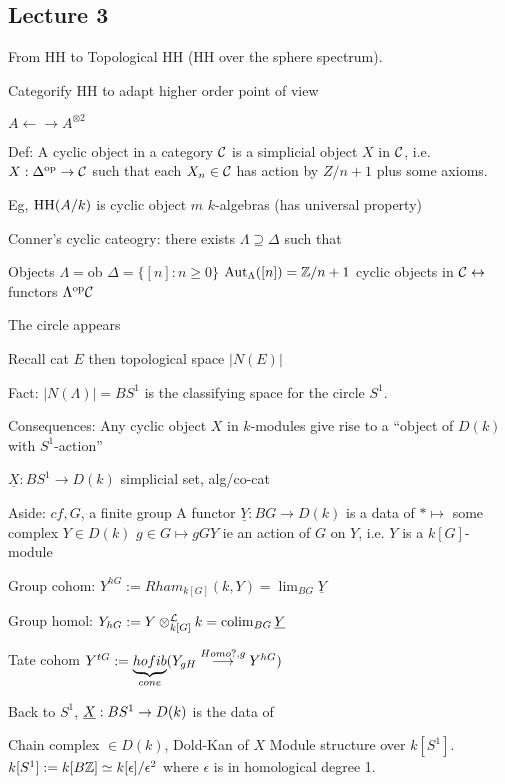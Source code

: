 \newpage
\subsection{Lecture 3}

From HH to Topological HH (HH over the sphere spectrum).

Categorify HH to adapt higher order point of view

$A \leftarrow \rightarrow A^{\otimes 2}$ %


Def: A cyclic object in a category $\mathcal{C}$ is a simplicial object $X$ in $\mathcal{C}$, i.e. $X: \Delta^\text{op} \to \mathcal{C}$ such that each $X_n \in \mathcal{C}$ has action by $Z/n+1$ plus some axioms. 




Eg, $\operatorname{HH}(A/k)$ is cyclic object $m$ $k$-algebras (has universal property)

Conner's cyclic cateogry: there exists $\Lambda \supseteq \Delta$ such that 

Objects $\Lambda= $ob $\Delta=\{[n] \colon n \geq 0\}$
$\operatorname{Aut}_\Lambda([n])= \mathbb{Z}/n+1$
cyclic objects in $\mathcal{C} \leftrightarrow$ functors $\Lambda^{\text{op}} \mathcal{C}$

The circle appears

Recall cat $E$ then topological space $|N(E)|$

Fact: $|N(\Lambda)|= BS^1$ is the classifying space for the circle $S^1$. 

Consequences: Any cyclic object $X$ in $k$-modules give rise to a ``object of $D(k)$ with $S^1$-action''

$\underline{X}: BS^1 \to D(k)$
simplicial set, alg/co-cat

Aside: $cf, G$, a finite group
A functor $\underline{Y}: BG \to D(k)$ is a data of 
$* \mapsto$ some complex $Y \in D(k)$
$g \in G \mapsto gGY$ ie an action of $G$ on $Y$, i.e. $Y$ is a $k[G]$-module

Group cohom: 
$Y^{hG}:= Rham_{k[G]}(k,Y)= \lim_{BG} \underline{Y}$

Group homol:
$Y_{hG}:= Y \otimes_{k[G]}^\mathcal{L} k = \operatorname{colim}_{BG} \underline{Y}$

Tate cohom
$Y^{tG}:= \underbrace{hofib}_{cone}(Y_{gH} \stackrel{Homo ?,g}{\longrightarrow} Y^{hG})$

Back to $S^1$, $\underline{X}: BS^1 \to D(k)$ is the data of 

Chain complex $\in D(k)$, Dold-Kan of $X$
Module structure over $k[S^1]$.
$k[S^1]:= k[B\mathbb{Z}] \simeq k[\epsilon]/\epsilon^2$
where $\epsilon$ is in homological degree 1.

